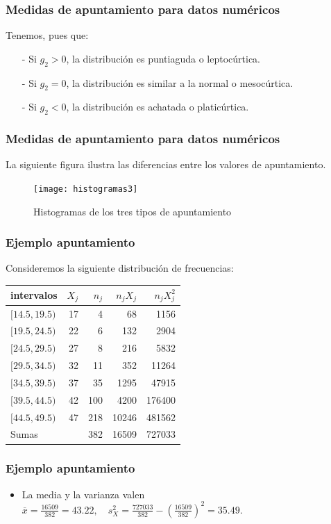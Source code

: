 \begin{frame}
\frametitle{Medidas de apuntamiento para datos numéricos}
 Tenemos, pues  que:
\begin{itemize}
\item[-] Si  $g_2>0$, la distribución
es puntiaguda o leptocúrtica.
\item[-]Si $g_2=0$, la distribución
es similar a la normal o mesocúrtica.
\item[-] Si $g_2<0$, la distribución
es achatada o platicúrtica.
\end{itemize}
\end{frame}
\begin{frame}
\frametitle{Medidas de apuntamiento para datos numéricos}
La siguiente figura ilustra las diferencias entre los valores de apuntamiento.
\begin{figure}
\begin{center}
\texttt{[image: histogramas3]}
\end{center}
\caption{Histogramas de los tres tipos de apuntamiento}
\end{figure}
\end{frame}

\begin{frame}
\frametitle{Ejemplo apuntamiento}
Consideremos la siguiente distribución de frecuencias:
\begin{center}
\begin{tabular}{lrrrr}
intervalos  &  $X_j$  & $n_j$   & $n_jX_j$   & $n_j X_j^2$  \\ \hline $[14.5,19.5)$ & 17
& 4    & 68    & 1156  \\ $[19.5,24.5)$ & 22  & 6    & 132   & 2904
\\ $[24.5,29.5)$ & 27 &   8   & 216   & 5832 \\ $[29.5,34.5)$ & 32 &  11   & 352   &
11264 \\ $[34.5,39.5)$ & 37 &  35   & 1295  &  47915 \\ $[39.5,44.5)$ & 42 & 100   & 4200
& 176400 \\ $[44.5,49.5)$ & 47 & 218  & 10246  & 481562 \\ \hline
  Sumas     & &    382  & 16509  & 727033
\end{tabular}
\end{center}
\end{frame}


\begin{frame}
\frametitle{Ejemplo apuntamiento}
\begin{itemize}
 \item La media y la varianza valen $
\overline{x} =  \frac{16509}{382}=43.22,\quad s_X^2=
\frac{727033}{382}-\left(\frac{16509}{382}\right)^2=35.49$.
\end{itemize}
\end{frame}

